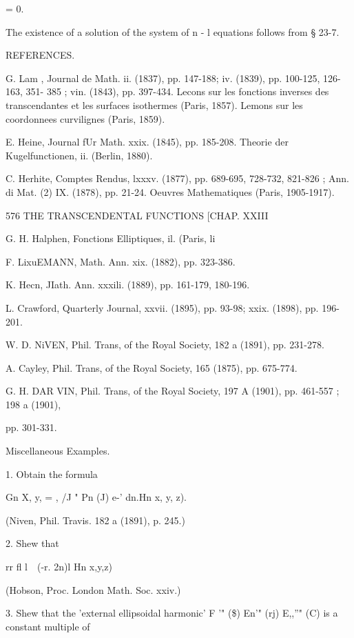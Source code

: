 {{{{{{{{= 0. 



The existence of a solution of the system of n - l equations follows from 
§ 23-7. 

REFERENCES. 

G. Lam , Journal de Math. ii. (1837), pp. 147-188; iv. (1839), pp. 100-125, 126-163, 351- 
385 ; vin. (1843), pp. 397-434. Lecons sur les fonctions inverses des transcendantes et 
les surfaces isothermes (Paris, 1857). Lemons sur les coordonnees curvilignes (Paris, 1859). 

E. Heine, Journal fUr Math. xxix. (1845), pp. 185-208. Theorie der Kugelfunctionen, ii. 
(Berlin, 1880). 

C. Herhite, Comptes Rendus, lxxxv. (1877), pp. 689-695, 728-732, 821-826 ; Ann. di Mat. 
(2) IX. (1878), pp. 21-24. Oeuvres Mathematiques (Paris, 1905-1917). 



576 THE TRANSCENDENTAL FUNCTIONS [CHAP. XXIII 



G. H. Halphen, Fonctions Elliptiques, il. (Paris, li 

F. LixuEMANN, Math. Ann. xix. (1882), pp. 323-386. 

K. Hecn, JIath. Ann. xxxili. (1889), pp. 161-179, 180-196. 

L. Crawford, Quarterly Journal, xxvii. (1895), pp. 93-98; xxix. (1898), pp. 196-201. 

W. D. NiVEN, Phil. Trans, of the Royal Society, 182 a (1891), pp. 231-278. 

A. Cayley, Phil. Trans, of the Royal Society, 165 (1875), pp. 675-774. 

G. H. DAR VIN, Phil. Trans, of the Royal Society, 197 A (1901), pp. 461-557 ; 198 a (1901), 

pp. 301-331. 

Miscellaneous Examples. 

1. Obtain the formula 

Gn  X, y,  = , /J " Pn (J) e-' dn.Hn  x, y, z). 

(Niven, Phil. Travis. 182 a (1891), p. 245.) 

2. Shew that 

rr fl   l\ \  (-r. 2n)l Hn x,y,z) 

(Hobson, Proc. London Math. Soc. xxiv.) 

3. Shew that the 'external ellipsoidal harmonic' F '" (\$) En'" (rj) E,,''" (C) is a constant 
multiple of 



}}}}}}}}
